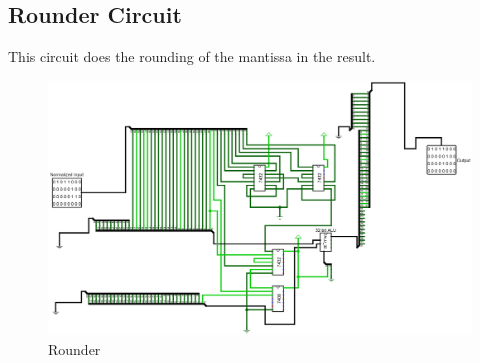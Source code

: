 \documentclass[12pt]{article}
\begin{document}
\newpage
\subsection{Rounder Circuit}
This circuit does the rounding of the mantissa in the result.
\begin{figure}[H]
    \centering
        \includegraphics[width=\textwidth]{Rounder.jpg}
    \caption{Rounder}\label{fig:rounder}
\end{figure}
\end{document}
